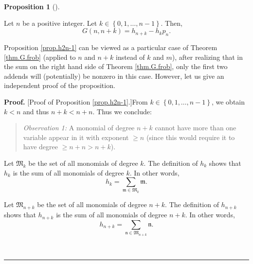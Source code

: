 \documentclass[numbers=enddot,12pt,final,onecolumn,notitlepage]{scrartcl}%
\theoremstyle{definition}
\newtheorem{prop}[theo]{Proposition}
\newenvironment{proposition}[1][]
{\begin{prop}[#1]\begin{leftbar}}
{\end{leftbar}\end{prop}}
\newenvironment{statement}{\begin{quote}}{\end{quote}}
\newenvironment{proof}[1][Proof]{\noindent\textbf{#1.} }{\ \rule{0.5em}{0.5em}}
\let\sumnonlimits\sum
\renewcommand{\sum}{\sumnonlimits\limits}
\begin{document}
\begin{proposition}
\label{prop.h2n-1}Let $n$ be a positive integer. Let $k\in\left\{
0,1,\ldots,n-1\right\}  $. Then,%
\[
G\left(  n,n+k\right)  =h_{n+k}-h_{k}p_{n}.
\]

\end{proposition}

Proposition \ref{prop.h2n-1} can be viewed as a particular case of Theorem
\ref{thm.G.frob} (applied to $n$ and $n+k$ instead of $k$ and $m$), after
realizing that in the sum on the right hand side of Theorem \ref{thm.G.frob},
only the first two addends will (potentially) be nonzero in this case.
However, let us give an independent proof of the proposition.

\begin{proof}
[Proof of Proposition \ref{prop.h2n-1}.]From $k\in\left\{  0,1,\ldots
,n-1\right\}  $, we obtain $k<n$ and thus $n+k<n+n$. Thus we conclude:

\begin{statement}
\textit{Observation 1:} A monomial of degree $n+k$ cannot have more than one
variable appear in it with exponent $\geq n$ (since this would require it to
have degree $\geq n+n>n+k$).
\end{statement}

Let $\mathfrak{M}_{k}$ be the set of all monomials of degree $k$. The
definition of $h_{k}$ shows that $h_{k}$ is the sum of all monomials of degree
$k$. In other words,%
\begin{equation}
h_{k}=\sum_{\mathfrak{m}\in\mathfrak{M}_{k}}\mathfrak{m}.
\label{pf.prop.h2n-1.hk=}%
\end{equation}


Let $\mathfrak{M}_{n+k}$ be the set of all monomials of degree $n+k$. The
definition of $h_{n+k}$ shows that $h_{n+k}$ is the sum of all monomials of
degree $n+k$. In other words,%
\begin{equation}
h_{n+k}=\sum_{\mathfrak{n}\in\mathfrak{M}_{n+k}}\mathfrak{n}.
\label{pf.prop.h2n-1.hn+k=}%
\end{equation}



\end{proof}
\end{document}
